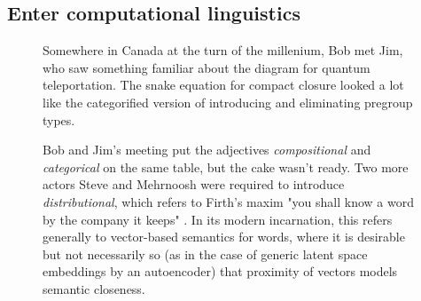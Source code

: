\subsection{Enter computational linguistics}

\begin{figure}[h!]
\centering
{}
\caption{Somewhere in Canada at the turn of the millenium, Bob met Jim, who saw something familiar about the diagram for quantum teleportation. The snake equation for compact closure looked a lot like the categorified version of introducing and eliminating pregroup types.
}
\end{figure}

\begin{figure}[h!]
\centering
{}
\caption{Bob and Jim's meeting put the adjectives \emph{compositional} and \emph{categorical} on the same table, but the cake wasn't ready. Two more actors Steve and Mehrnoosh were required to introduce \emph{distributional}, which refers to Firth's maxim "you shall know a word by the company it keeps" \citep{firthStudiesLinguisticAnalysis1957}. In its modern incarnation, this refers generally to vector-based semantics for words, where it is desirable but not necessarily so (as in the case of generic latent space embeddings by an autoencoder) that proximity of vectors models semantic closeness.}
\end{figure}

